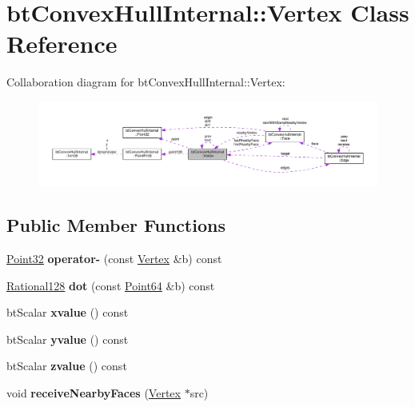 \hypertarget{classbtConvexHullInternal_1_1Vertex}{}\section{bt\+Convex\+Hull\+Internal\+:\+:Vertex Class Reference}
\label{classbtConvexHullInternal_1_1Vertex}


Collaboration diagram for bt\+Convex\+Hull\+Internal\+:\+:Vertex\+:
\nopagebreak
\begin{figure}[H]
\begin{center}
\leavevmode
\includegraphics[width=350pt]{classbtConvexHullInternal_1_1Vertex__coll__graph}
\end{center}
\end{figure}
\subsection*{Public Member Functions}
\begin{DoxyCompactItemize}
\item 
\mbox{\label{classbtConvexHullInternal_1_1Vertex_a05aa1de4f1f715c8ffba457b82bdab22}} 
\hyperlink{classbtConvexHullInternal_1_1Point32}{Point32} {\bfseries operator-\/} (const \hyperlink{classbtConvexHullInternal_1_1Vertex}{Vertex} \&b) const
\item 
\mbox{\label{classbtConvexHullInternal_1_1Vertex_a293c4989e245583e6b37d53295476c41}} 
\hyperlink{classbtConvexHullInternal_1_1Rational128}{Rational128} {\bfseries dot} (const \hyperlink{classbtConvexHullInternal_1_1Point64}{Point64} \&b) const
\item 
\mbox{\label{classbtConvexHullInternal_1_1Vertex_a62e535dc95fb561c62f42dadaffc7885}} 
bt\+Scalar {\bfseries xvalue} () const
\item 
\mbox{\label{classbtConvexHullInternal_1_1Vertex_a5ec563379e215ce46b8afd645f0ab840}} 
bt\+Scalar {\bfseries yvalue} () const
\item 
\mbox{\label{classbtConvexHullInternal_1_1Vertex_a52c82aa9fd637c4d0e2d87d670bee42a}} 
bt\+Scalar {\bfseries zvalue} () const
\item 
\mbox{\label{classbtConvexHullInternal_1_1Vertex_a584ed968134a9728d686f2732c52089b}} 
void {\bfseries receive\+Nearby\+Faces} (\hyperlink{classbtConvexHullInternal_1_1Vertex}{Vertex} $\ast$src)
\end{DoxyCompactItemize}
